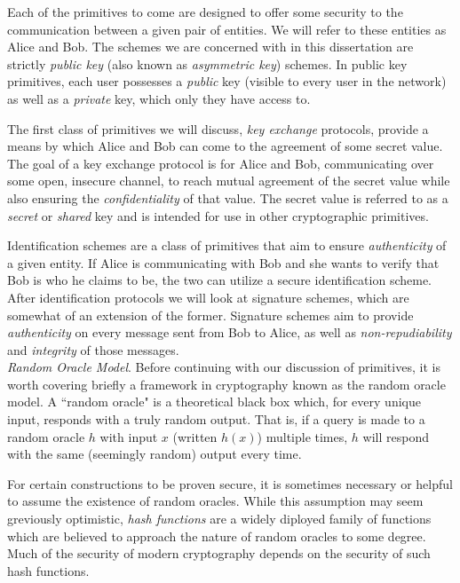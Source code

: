 Each of the primitives to come are designed to offer some security to the communication between a given pair of entities. We will refer to these entities as Alice and Bob. The schemes we are concerned with in this dissertation are strictly \emph{public key} (also known as \emph{asymmetric key}) schemes. In public key primitives, each user possesses a \emph{public} key (visible to every user in the network) as well as a \emph{private} key, which only they have access to.

The first class of primitives we will discuss, \emph{key exchange} protocols, provide a means by which Alice and Bob can come to the agreement of some secret value. The goal of a key exchange protocol is for Alice and Bob, communicating over some open, insecure channel, to reach mutual agreement of the secret value while also ensuring the \emph{confidentiality} of that value. The secret value is referred to as a \emph{secret} or \emph{shared} key and is intended for use in other cryptographic primitives.

Identification schemes are a class of primitives that aim to ensure \emph{authenticity} of a given entity. If Alice is communicating with Bob and she wants to verify that Bob is who he claims to be, the two can utilize a secure identification scheme. After identification protocols we will look at signature schemes, which are somewhat of an extension of the former. Signature schemes aim to provide \emph{authenticity} on every message sent from Bob to Alice, as well as \emph{non-repudiability} and \emph{integrity} of those messages.\\

\noindent
\emph{Random Oracle Model}. Before continuing with our discussion of primitives, it is worth covering briefly a framework in cryptography known as the random oracle model. A ``random oracle" is a theoretical black box which, for every unique input, responds with a truly random output. That is, if a query is made to a random oracle $h$ with input $x$ (written $h(x)$) multiple times, $h$ will respond with the same (seemingly random) output every time.

For certain constructions to be proven secure, it is sometimes necessary or helpful to assume the existence of random oracles. While this assumption may seem greviously optimistic, \emph{hash functions} are a widely diployed family of functions which are believed to approach the nature of random oracles to some degree. Much of the security of modern cryptography depends on the security of such hash functions.


